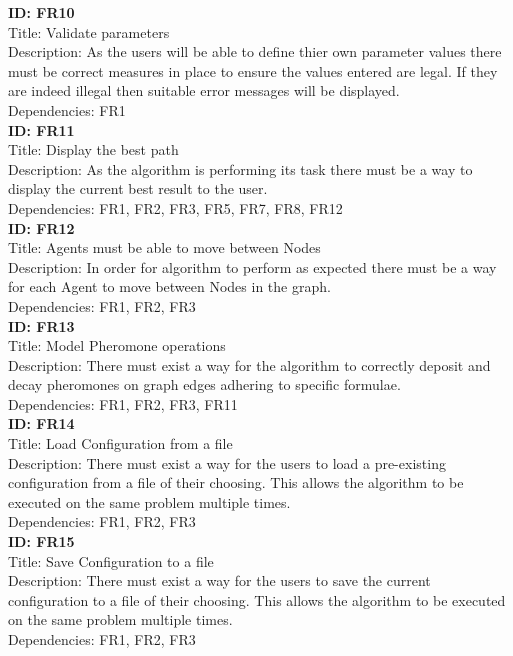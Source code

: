 \noindent
\textbf{ID: FR10}\\
Title: Validate parameters\\
Description: As the users will be able to define thier own parameter values there must be correct measures in place to ensure the values entered are legal. If they are indeed illegal then suitable error messages will be displayed. \\
Dependencies: FR1
\\

\noindent
\textbf{ID: FR11}\\
Title: Display the best path\\
Description: As the algorithm is performing its task there must be a way to display the current best result to the user. \\
Dependencies: FR1, FR2, FR3, FR5, FR7, FR8, FR12
\\

\noindent
\textbf{ID: FR12}\\
Title: Agents must be able to move between Nodes\\
Description: In order for algorithm to perform as expected there must be a way for each Agent to move between Nodes in the graph. \\
Dependencies: FR1, FR2, FR3
\\

\noindent
\textbf{ID: FR13}\\
Title: Model Pheromone operations\\
Description: There must exist a way for the algorithm to correctly deposit and decay pheromones on graph edges adhering to specific formulae. \\
Dependencies: FR1, FR2, FR3, FR11
\\

\noindent
\textbf{ID: FR14}\\
Title: Load Configuration from a file\\
Description: There must exist a way for the users to load a pre-existing configuration from a file of their choosing. This allows the algorithm to be executed on the same problem multiple times. \\
Dependencies: FR1, FR2, FR3
\\

\noindent
\textbf{ID: FR15}\\
Title: Save Configuration to a file\\
Description: There must exist a way for the users to save the current configuration to a file of their choosing. This allows the algorithm to be executed on the same problem multiple times. \\
Dependencies: FR1, FR2, FR3
\\

